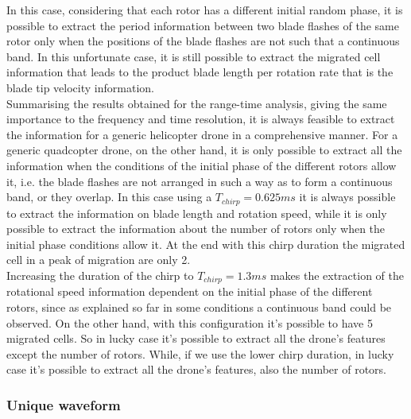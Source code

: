 In this case, considering that each rotor has a different initial random phase, it is possible to extract the period information between two blade flashes of the same rotor only when the positions of the blade flashes are not such that a continuous band. In this unfortunate case, it is still possible to extract the migrated cell information that leads to the product blade length per rotation rate that is the blade tip velocity information.\\
Summarising the results obtained for the range-time analysis, giving the same importance to the frequency and time resolution, it is always feasible to extract the information for a generic helicopter drone in a comprehensive manner. For a generic quadcopter drone, on the other hand, it is only possible to extract all the information when the conditions of the initial phase of the different rotors allow it, i.e. the blade flashes are not arranged in such a way as to form a continuous band, or they overlap. In this case using a $T_{chirp} = 0.625ms$ it is always possible to extract the information on blade length and rotation speed, while it is only possible to extract the information about the number of rotors only when the initial phase conditions allow it. At the end with this chirp duration the migrated cell in a peak of migration are only 2.\\
Increasing the duration of the chirp to $T_{chirp} = 1.3ms$ makes the extraction of the rotational speed information dependent on the initial phase of the different rotors, since as explained so far in some conditions a continuous band could be observed. On the other hand, with this configuration it's possible to have 5 migrated cells. So in lucky case it's possible to extract all the drone's features except the number of rotors. While, if we use the lower chirp duration, in lucky case it's possible to extract all the drone's features, also the number of rotors.

\subsubsection{Unique waveform}

